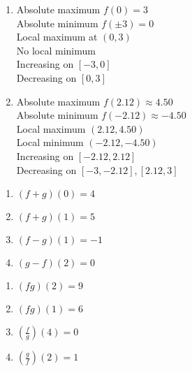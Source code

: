 \begin{multicols}{2}
\begin{enumerate}
\setcounter{enumi}{\value{HW}}

\item Absolute maximum $f(0) = 3$ \\
Absolute minimum $f(\pm 3) = 0$ \\
Local maximum at $(0, 3)$ \\
No local minimum\\
Increasing on $[-3, 0]$\\
Decreasing on $[0, 3]$

\item Absolute maximum $f(2.12) \approx 4.50$ \\
Absolute minimum $f(-2.12) \approx -4.50$ \\
Local maximum $(2.12, 4.50)$ \\
Local minimum $(-2.12, -4.50)$\\
Increasing on $[-2.12, 2.12]$\\
Decreasing on $[-3, -2.12], [2.12, 3]$

\setcounter{HW}{\value{enumi}}
\end{enumerate}
\end{multicols}

\begin{multicols}{4}
\begin{enumerate}
\setcounter{enumi}{\value{HW}}

\item  $(f+g)(0) = 4$
\item  $(f+g)(1) = 5$ 
\item  $(f-g)(1) = -1$
\item  $(g-f)(2) = 0$

\setcounter{HW}{\value{enumi}}
\end{enumerate}
\end{multicols}

\begin{multicols}{4}
\begin{enumerate}
\setcounter{enumi}{\value{HW}}

\item  $(fg)(2) = 9$
\item  $(fg)(1) = 6$
\item  $\left(\frac{f}{g}\right)(4) = 0$
\item  $\left(\frac{g}{f}\right)(2) = 1$

\setcounter{HW}{\value{enumi}}
\end{enumerate}
\end{multicols}

